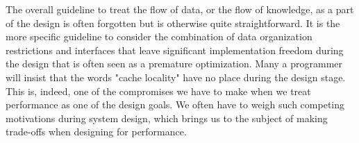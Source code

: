 The overall guideline to treat the flow of data, or the flow of knowledge, as a part of the design is often forgotten but is otherwise quite straightforward. It is the more specific guideline to consider the combination of data organization restrictions and interfaces that leave significant implementation freedom during the design that is often seen as a premature optimization. Many a programmer will insist that the words "cache locality" have no place during the design stage. This is, indeed, one of the compromises we have to make when we treat performance as one of the design goals. We often have to weigh such competing motivations during system design, which brings us to the subject of making trade-offs when designing for performance.



































